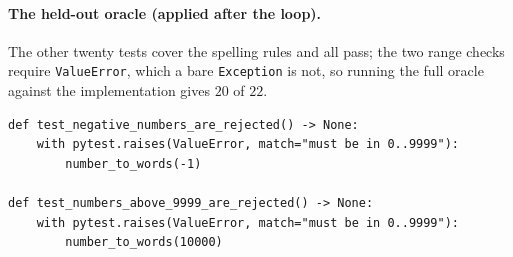 \paragraph{The held-out oracle (applied after the loop).} The other twenty tests cover the
spelling rules and all pass; the two range checks require \texttt{ValueError}, which a bare
\texttt{Exception} is not, so running the full oracle against the implementation gives $20$ of
$22$.
\begin{small}
\begin{Verbatim}[breaklines,breakanywhere]
def test_negative_numbers_are_rejected() -> None:
    with pytest.raises(ValueError, match="must be in 0..9999"):
        number_to_words(-1)

def test_numbers_above_9999_are_rejected() -> None:
    with pytest.raises(ValueError, match="must be in 0..9999"):
        number_to_words(10000)
\end{Verbatim}
\end{small}

